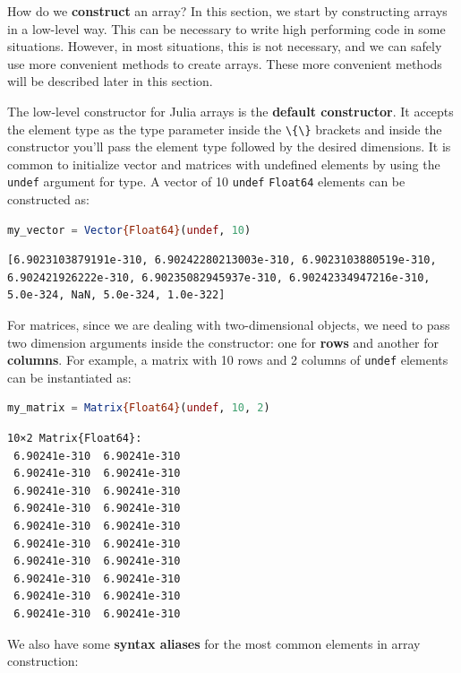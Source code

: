 \documentclass[
  notoc %
]{tufte-book}
\newcommand{\passthrough}[1]{#1}
\begin{document}
How do we \textbf{construct} an array? In this section, we start by
constructing arrays in a low-level way. This can be necessary to write
high performing code in some situations. However, in most situations,
this is not necessary, and we can safely use more convenient methods to
create arrays. These more convenient methods will be described later in
this section.

The low-level constructor for Julia arrays is the \textbf{default
constructor}. It accepts the element type as the type parameter inside
the \passthrough{\lstinline!\{\}!} brackets and inside the constructor
you'll pass the element type followed by the desired dimensions. It is
common to initialize vector and matrices with undefined elements by
using the \passthrough{\lstinline!undef!} argument for type. A vector of
10 \passthrough{\lstinline!undef!} \passthrough{\lstinline!Float64!}
elements can be constructed as:

\begin{lstlisting}[language=Julia]
my_vector = Vector{Float64}(undef, 10)
\end{lstlisting}

\begin{lstlisting}[language=Output]
[6.9023103879191e-310, 6.90242280213003e-310, 6.9023103880519e-310, 6.902421926222e-310, 6.90235082945937e-310, 6.90242334947216e-310, 5.0e-324, NaN, 5.0e-324, 1.0e-322]
\end{lstlisting}

For matrices, since we are dealing with two-dimensional objects, we need
to pass two dimension arguments inside the constructor: one for
\textbf{rows} and another for \textbf{columns}. For example, a matrix
with 10 rows and 2 columns of \passthrough{\lstinline!undef!} elements
can be instantiated as:

\begin{lstlisting}[language=Julia]
my_matrix = Matrix{Float64}(undef, 10, 2)
\end{lstlisting}

\begin{lstlisting}[language=Output]
10×2 Matrix{Float64}:
 6.90241e-310  6.90241e-310
 6.90241e-310  6.90241e-310
 6.90241e-310  6.90241e-310
 6.90241e-310  6.90241e-310
 6.90241e-310  6.90241e-310
 6.90241e-310  6.90241e-310
 6.90241e-310  6.90241e-310
 6.90241e-310  6.90241e-310
 6.90241e-310  6.90241e-310
 6.90241e-310  6.90241e-310
\end{lstlisting}

We also have some \textbf{syntax aliases} for the most common elements
in array construction:
\end{document}
